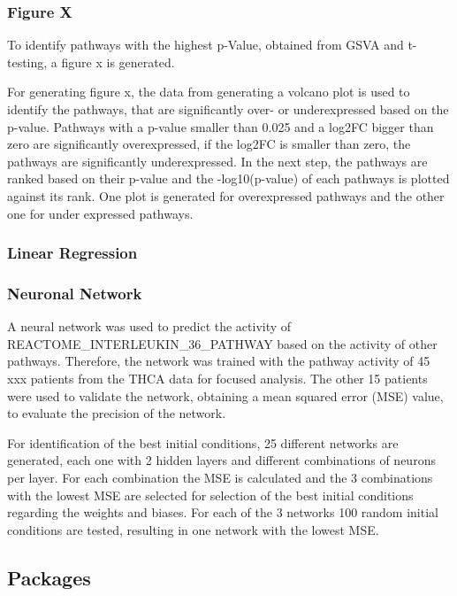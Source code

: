 \documentclass[
]{article}
\begin{document}
\hypertarget{figure-x}{%
\subsubsection{Figure X}\label{figure-x}}

To identify pathways with the highest p-Value, obtained from GSVA and
t-testing, a figure x is generated.

For generating figure x, the data from generating a volcano plot is used
to identify the pathways, that are significantly over- or underexpressed
based on the p-value. Pathways with a p-value smaller than 0.025 and a
log2FC bigger than zero are significantly overexpressed, if the log2FC
is smaller than zero, the pathways are significantly underexpressed. In
the next step, the pathways are ranked based on their p-value and the
-log10(p-value) of each pathways is plotted against its rank. One plot
is generated for overexpressed pathways and the other one for under
expressed pathways.

\hypertarget{linear-regression}{%
\subsubsection{Linear Regression}\label{linear-regression}}

\hypertarget{neuronal-network}{%
\subsubsection{Neuronal Network}\label{neuronal-network}}

A neural network was used to predict the activity of
REACTOME\_INTERLEUKIN\_36\_PATHWAY based on the activity of other
pathways. Therefore, the network was trained with the pathway activity
of 45 xxx patients from the THCA data for focused analysis. The other 15
patients were used to validate the network, obtaining a mean squared
error (MSE) value, to evaluate the precision of the network.

For identification of the best initial conditions, 25 different networks
are generated, each one with 2 hidden layers and different combinations
of neurons per layer. For each combination the MSE is calculated and the
3 combinations with the lowest MSE are selected for selection of the
best initial conditions regarding the weights and biases. For each of
the 3 networks 100 random initial conditions are tested, resulting in
one network with the lowest MSE.

\hypertarget{packages}{%
\subsection{Packages}\label{packages}}
\end{document}
